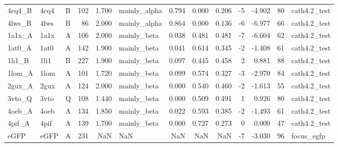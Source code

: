 \begin{table}
\begin{tabular}{lllrrlrrrrrrl}
4cq4\_B & 4cq4 & B & 102 & 1.700 & mainly\_alpha & 0.794 & 0.000 & 0.206 & -5 & -4.902 & 80 & cath4.2\_test \\
4lws\_B & 4lws & B & 86 & 2.000 & mainly\_alpha & 0.864 & 0.000 & 0.136 & -6 & -6.977 & 66 & cath4.2\_test \\
1a1x\_A & 1a1x & A & 106 & 2.000 & mainly\_beta & 0.038 & 0.481 & 0.481 & -7 & -6.604 & 62 & cath4.2\_test \\
1at0\_A & 1at0 & A & 142 & 1.900 & mainly\_beta & 0.041 & 0.614 & 0.345 & -2 & -1.408 & 61 & cath4.2\_test \\
1li1\_B & 1li1 & B & 227 & 1.900 & mainly\_beta & 0.097 & 0.445 & 0.458 & 2 & 0.881 & 88 & cath4.2\_test \\
1lom\_A & 1lom & A & 101 & 1.720 & mainly\_beta & 0.099 & 0.574 & 0.327 & -3 & -2.970 & 84 & cath4.2\_test \\
2gux\_A & 2gux & A & 124 & 2.000 & mainly\_beta & 0.000 & 0.540 & 0.460 & -2 & -1.613 & 55 & cath4.2\_test \\
3vto\_Q & 3vto & Q & 108 & 1.440 & mainly\_beta & 0.000 & 0.509 & 0.491 & 1 & 0.926 & 80 & cath4.2\_test \\
4oeb\_A & 4oeb & A & 134 & 1.850 & mainly\_beta & 0.022 & 0.593 & 0.385 & -2 & -1.493 & 61 & cath4.2\_test \\
4pif\_A & 4pif & A & 139 & 1.700 & mainly\_beta & 0.000 & 0.727 & 0.273 & 0 & 0.000 & 47 & cath4.2\_test \\
eGFP & eGFP & A & 231 & NaN & NaN & NaN & NaN & NaN & -7 & -3.030 & 96 & focus\_egfp \\
\bottomrule
\end{tabular}
\end{table}
